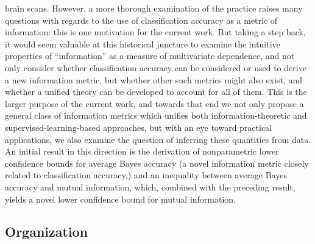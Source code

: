 \documentclass[12pt]{article}
\begin{document}
brain scans.  However, a more thorough examination of the practice
raises many questions with regards to the use of classification
accuracy as a metric of information: this is one motivation for the
current work.  But taking a step back, it would seem valuable at this
historical juncture to examine the intuitive properties of
``information'' as a measure of multivariate dependence, and not only
consider whether classification accuracy can be considered or used to
derive a new information metric, but whether other such metrics might
also exist, and whether a unified theory can be developed to account
for all of them.  This is the larger purpose of the current work, and
towards that end we not only propose a general class of information
metrics which unifies both information-theoretic and
supervised-learning-based approaches, but with an eye toward practical
applications, we also examine the question of inferring these
quantities from data.  An initial result in this direction is the
derivation of nonparametric lower confidence bounds for average Bayes
accuracy (a novel information metric closely related to classification
accuracy,) and an inequality between average Bayes accuracy and mutual
information, which, combined with the preceding result, yields a novel
lower confidence bound for mutual information.

\subsection{Organization}
\end{document}
